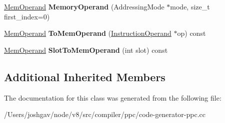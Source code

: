 \begin{DoxyCompactItemize}
\item 
\hyperlink{classv8_1_1internal_1_1_mem_operand}{Mem\+Operand} {\bfseries Memory\+Operand} (Addressing\+Mode $\ast$mode, size\+\_\+t first\+\_\+index=0)\hypertarget{classv8_1_1internal_1_1compiler_1_1_p_p_c_operand_converter_a9f5d84abb2a0fde03c517c2c0ea30a18}{}\label{classv8_1_1internal_1_1compiler_1_1_p_p_c_operand_converter_a9f5d84abb2a0fde03c517c2c0ea30a18}

\item 
\hyperlink{classv8_1_1internal_1_1_mem_operand}{Mem\+Operand} {\bfseries To\+Mem\+Operand} (\hyperlink{classv8_1_1internal_1_1compiler_1_1_instruction_operand}{Instruction\+Operand} $\ast$op) const \hypertarget{classv8_1_1internal_1_1compiler_1_1_p_p_c_operand_converter_ab4c5579f54dad330ceef6f44609ed010}{}\label{classv8_1_1internal_1_1compiler_1_1_p_p_c_operand_converter_ab4c5579f54dad330ceef6f44609ed010}

\item 
\hyperlink{classv8_1_1internal_1_1_mem_operand}{Mem\+Operand} {\bfseries Slot\+To\+Mem\+Operand} (int slot) const \hypertarget{classv8_1_1internal_1_1compiler_1_1_p_p_c_operand_converter_a2f33c9533f8f79fb69acc46fa30fb6a5}{}\label{classv8_1_1internal_1_1compiler_1_1_p_p_c_operand_converter_a2f33c9533f8f79fb69acc46fa30fb6a5}

\end{DoxyCompactItemize}
\subsection*{Additional Inherited Members}


The documentation for this class was generated from the following file\+:\begin{DoxyCompactItemize}
\item 
/\+Users/joshgav/node/v8/src/compiler/ppc/code-\/generator-\/ppc.\+cc\end{DoxyCompactItemize}
